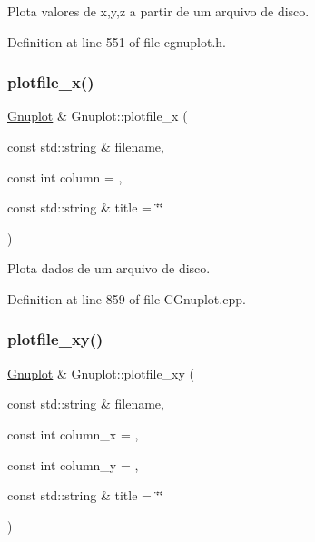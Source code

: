 Plota valores de x,y,z a partir de um arquivo de disco. 



Definition at line 551 of file cgnuplot.\+h.

\mbox{\label{class_gnuplot_a4ca35415fa5560764597cfdfa46c6c40}} 
\subsubsection{\texorpdfstring{plotfile\+\_\+x()}{plotfile\_x()}}
{\footnotesize\ttfamily \hyperlink{class_gnuplot}{Gnuplot} \& Gnuplot\+::plotfile\+\_\+x (\begin{DoxyParamCaption}\item[{const std\+::string \&}]{filename,  }\item[{const int}]{column = {},  }\item[{const std\+::string \&}]{title = {\ttfamily \char`\"{}\char`\"{}} }\end{DoxyParamCaption})}



Plota dados de um arquivo de disco. 



Definition at line 859 of file C\+Gnuplot.\+cpp.

\mbox{\label{class_gnuplot_af226f395310d3c5c4f8b4d2aaf5d8823}} 
\subsubsection{\texorpdfstring{plotfile\+\_\+xy()}{plotfile\_xy()}}
{\footnotesize\ttfamily \hyperlink{class_gnuplot}{Gnuplot} \& Gnuplot\+::plotfile\+\_\+xy (\begin{DoxyParamCaption}\item[{const std\+::string \&}]{filename,  }\item[{const int}]{column\+\_\+x = {},  }\item[{const int}]{column\+\_\+y = {},  }\item[{const std\+::string \&}]{title = {\ttfamily \char`\"{}\char`\"{}} }\end{DoxyParamCaption})}



